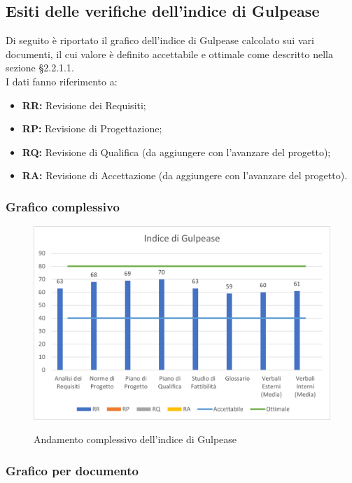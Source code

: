 \subsection{Esiti delle verifiche dell'indice di Gulpease}
Di seguito è riportato il grafico dell'indice di Gulpease calcolato sui vari documenti, il cui valore è definito accettabile e ottimale come descritto nella sezione §2.2.1.1.\\
I dati fanno riferimento a:
\begin{itemize}
	\item \textbf{RR:} Revisione dei Requisiti;
	\item \textbf{RP:} Revisione di Progettazione;
	\item \textbf{RQ:} Revisione di Qualifica (da aggiungere con l'avanzare del progetto);
	\item \textbf{RA:} Revisione di Accettazione (da aggiungere con l'avanzare del progetto).
\end{itemize} 

\subsubsection{Grafico complessivo}

\begin{figure}[H]
\centering
\includegraphics[scale=0.90]{res/ResocontoAttivitaDiVerifica/res/img/indiceGulpease.png}\\
\caption{Andamento complessivo dell'indice di Gulpease}
\end{figure}

\subsubsection{Grafico per documento}

